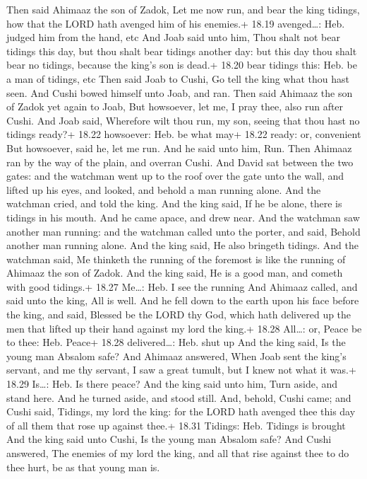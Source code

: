  Then said Ahimaaz the son of Zadok, Let me now run, and
bear the king tidings, how that the LORD hath avenged him of his
enemies.+ 18.19 avenged\ldots: Heb. judged him from the hand, etc
 And Joab said unto him, Thou shalt not bear tidings this
day, but thou shalt bear tidings another day: but this day thou shalt
bear no tidings, because the king's son is dead.+ 18.20 bear tidings
this: Heb. be a man of tidings, etc  Then said Joab to
Cushi, Go tell the king what thou hast seen. And Cushi bowed himself
unto Joab, and ran.  Then said Ahimaaz the son of Zadok yet
again to Joab, But howsoever, let me, I pray thee, also run after Cushi.
And Joab said, Wherefore wilt thou run, my son, seeing that thou hast no
tidings ready?+ 18.22 howsoever: Heb. be what may+ 18.22 ready: or,
convenient  But howsoever, said he, let me run. And he said
unto him, Run. Then Ahimaaz ran by the way of the plain, and overran
Cushi.  And David sat between the two gates: and the
watchman went up to the roof over the gate unto the wall, and lifted up
his eyes, and looked, and behold a man running alone.  And
the watchman cried, and told the king. And the king said, If he be
alone, there is tidings in his mouth. And he came apace, and drew near.
 And the watchman saw another man running: and the watchman
called unto the porter, and said, Behold another man running alone. And
the king said, He also bringeth tidings.  And the watchman
said, Me thinketh the running of the foremost is like the running of
Ahimaaz the son of Zadok. And the king said, He is a good man, and
cometh with good tidings.+ 18.27 Me\ldots: Heb. I see the running
 And Ahimaaz called, and said unto the king, All is well.
And he fell down to the earth upon his face before the king, and said,
Blessed be the LORD thy God, which hath delivered up the men that lifted
up their hand against my lord the king.+ 18.28 All\ldots: or, Peace be
to thee: Heb. Peace+ 18.28 delivered\ldots: Heb. shut up 
And the king said, Is the young man Absalom safe? And Ahimaaz answered,
When Joab sent the king's servant, and me thy servant, I saw a great
tumult, but I knew not what it was.+ 18.29 Is\ldots: Heb. Is there
peace?  And the king said unto him, Turn aside, and stand
here. And he turned aside, and stood still.  And, behold,
Cushi came; and Cushi said, Tidings, my lord the king: for the LORD hath
avenged thee this day of all them that rose up against thee.+ 18.31
Tidings: Heb. Tidings is brought  And the king said unto
Cushi, Is the young man Absalom safe? And Cushi answered, The enemies of
my lord the king, and all that rise against thee to do thee hurt, be as
that young man is.

